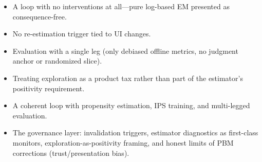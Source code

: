 \begin{interviewq}
\redflags
\begin{itemize}
    \item A loop with no interventions at all---pure log-based EM presented as consequence-free.
    \item No re-estimation trigger tied to UI changes.
    \item Evaluation with a single leg (only debiased offline metrics, no judgment anchor or randomized slice).
    \item Treating exploration as a product tax rather than part of the estimator's positivity requirement.
\end{itemize}


\goodgreat
\begin{itemize}
    \item {} A coherent loop with propensity estimation, IPS training, and multi-legged evaluation.
    \item {} The governance layer: invalidation triggers, estimator diagnostics as first-class monitors, exploration-as-positivity framing, and honest limits of PBM corrections (trust/presentation bias).
\end{itemize}

\end{interviewq}

